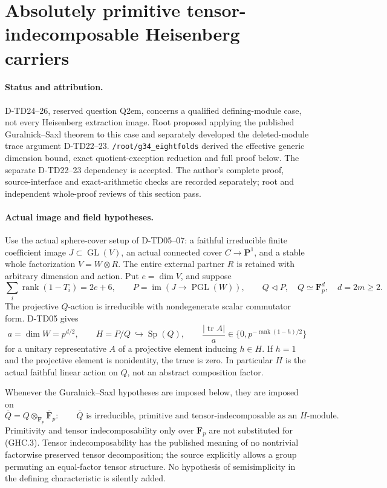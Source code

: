 \section{Absolutely primitive tensor-indecomposable Heisenberg carriers}
\label{sec:heisenberg-absolute-primitive-carrier}

\paragraph{Status and attribution.}
D-TD24--26, reserved question Q2em, concerns a qualified defining-module
case, not every Heisenberg extraction image.  Root proposed applying the
published Guralnick--Saxl theorem to this case and separately developed
the deleted-module trace argument D-TD22--23.
\texttt{/root/g34\_eightfolds} derived the effective generic dimension
bound, exact quotient-exception reduction and full proof below.
The separate D-TD22--23 dependency is accepted.  The author's complete
proof, source-interface and exact-arithmetic checks are recorded
separately; root and independent whole-proof reviews of this section pass.

\paragraph{Actual image and field hypotheses.}
Use the actual sphere-cover setup of D-TD05--07: a faithful irreducible
finite coefficient image $J\subset\operatorname{GL}(V)$, an actual
connected cover $C\to\mathbf P^1$, and a stable whole factorization
$V=W\otimes R$.  The entire external partner $R$ is retained with
arbitrary dimension and action.  Put $e=\dim V$, and suppose
\[
 \sum_i\operatorname{rank}(1-T_i)=2e+6,\qquad
 P=\operatorname{im}(J\to\operatorname{PGL}(W)),\qquad
 Q\triangleleft P,\quad Q\simeq\mathbf F_p^d,\quad d=2m\ge2.
 \tag{GHC.1}
\]
The projective $Q$-action is irreducible with nondegenerate scalar
commutator form.  D-TD05 gives
\[
 a=\dim W=p^{d/2},\qquad
 H=P/Q\ \hookrightarrow\operatorname{Sp}(Q),\qquad
 \frac{|\operatorname{tr}A|}{a}
 \in\{0,p^{-\operatorname{rank}(1-h)/2}\}
 \tag{GHC.2}
\]
for a unitary representative $A$ of a projective element inducing
$h\in H$.  If $h=1$ and the projective element is nonidentity,
the trace is zero.  In particular $H$ is the actual faithful
linear action on $Q$, not an abstract composition factor.

Whenever the Guralnick--Saxl hypotheses are imposed below, they are
imposed on
\[
                         \overline Q=Q\otimes_{\mathbf F_p}
                                      \overline{\mathbf F}_p:
 \qquad \overline Q\text{ is irreducible, primitive and
 tensor-indecomposable as an }H\text{-module}.
 \tag{GHC.3}
\]
Primitivity and tensor indecomposability only over $\mathbf F_p$
are not substituted for (GHC.3).  Tensor indecomposability has the
published meaning of no nontrivial factorwise preserved tensor
decomposition; the source explicitly allows a group permuting an
equal-factor tensor structure.  No hypothesis of semisimplicity in
the defining characteristic is silently added.


